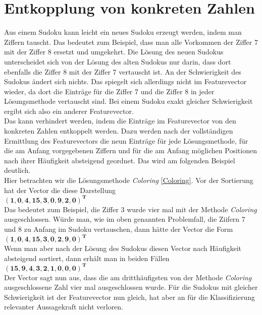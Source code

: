 \newpage
\section{Entkopplung von konkreten Zahlen}
\label{Entkopplung}
Aus einem Sudoku kann leicht ein neues Sudoku erzeugt werden, indem man Ziffern tauscht. Das bedeutet zum Beispiel, dass man alle Vorkommen der Ziffer 7 mit der Ziffer 8 ersetzt und umgekehrt. Die Lösung des neuen Sudokus unterscheidet sich von der Lösung des alten Sudokus nur darin, dass dort ebenfalls die Ziffer 8 mit der Ziffer 7 vertauscht ist. An der Schwierigkeit des Sudokus ändert sich nichts. Das spiegelt sich allerdings nicht im Featurevector wieder, da dort die Einträge für die Ziffer 7 und die Ziffer 8 in jeder Lösungsmethode vertauscht sind. Bei einem Sudoku exakt gleicher Schwierigkeit ergibt sich also ein anderer Featurevector.\\
Das kann verhindert werden, indem die Einträge im Featurevector von den konkreten Zahlen entkoppelt werden. Dazu werden nach der vollständigen Ermittlung des Featurevectors die neun Einträge für jede Lösungsmethode, für die am Anfang vorgegebenen Ziffern und für die am Anfang möglichen Positionen nach ihrer Häufigkeit absteigend geordnet. Das wird am folgenden Beispiel deutlich.\\
Hier betrachten wir die Lösungsmethode \textit{Coloring} \ref{Coloring}. Vor der Sortierung hat der Vector die diese Darstellung \\
$\mathbf{(1, 0, 4, 15, 3, 0, 9, 2, 0)^{T}}$\\
Das bedeutet zum Beispiel, die Ziffer 3 wurde vier mal mit der Methode \textit{Coloring} ausgeschlossen. Würde man, wie im oben genannten Problemfall, die Ziifern 7 und 8 zu Anfang im Sudoku vertauschen, dann hätte der Vector die Form\\
$\mathbf{(1, 0, 4, 15, 3, 0, 2, 9, 0)^{T}}$\\
Wenn man aber nach der Lösung des Sudokus diesen Vector nach Häufigkeit absteigend sortiert, dann erhält man in beiden Fällen\\
$\mathbf{(15, 9, 4, 3, 2, 1, 0, 0, 0)^{T}}$\\
Der Vector sagt nun aus, dass die am dritthäufigsten von der Methode \textit{Coloring} ausgeschlossene Zahl vier mal ausgeschlossen wurde. Für die Sudokus mit gleicher Schwierigkeit ist der Featurevector nun gleich, hat aber an für die Klassifizierung relevanter Aussagekraft nicht verloren.
